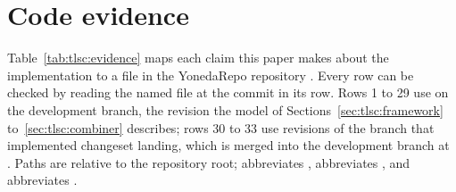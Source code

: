 \documentclass[11pt,letterpaper]{article}
\theoremstyle{definition}
\theoremstyle{remark}
\begin{document}
\appendix

\section{Code evidence}
\label{app:tlsc:evidence}

Table~\ref{tab:tlsc:evidence} maps each claim this paper makes about the implementation to a file in the YonedaRepo repository \cite{yonedarepo}. Every row can be checked by reading the named file at the commit in its row. Rows 1 to 29 use  on the development branch, the revision the model of Sections~\ref{sec:tlsc:framework} to~\ref{sec:tlsc:combiner} describes; rows 30 to 33 use revisions of the branch that implemented changeset landing, which is merged into the development branch at . Paths are relative to the repository root;  abbreviates ,  abbreviates , and  abbreviates .
\end{document}
